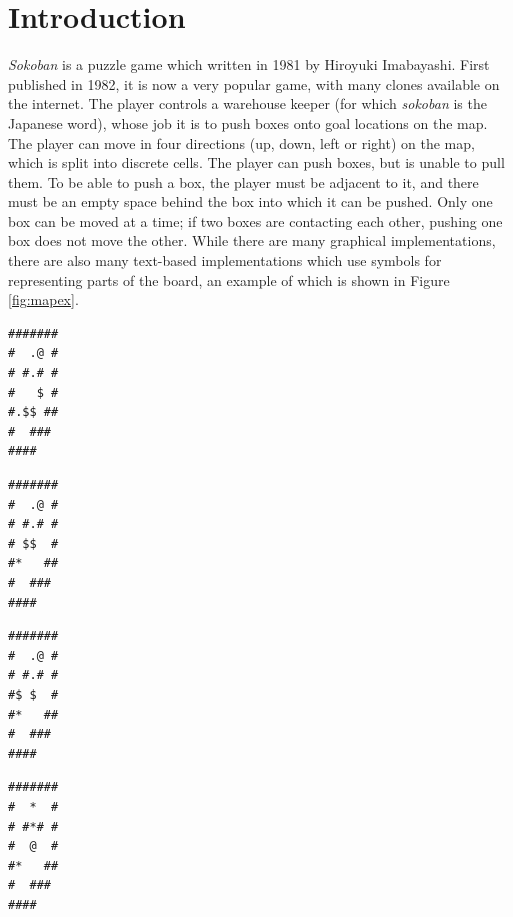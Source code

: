 \documentclass[a4paper,11pt]{article}
\begin{document}
\section{Introduction}
\emph{Sokoban} is a puzzle game which written in 1981 by Hiroyuki Imabayashi. First published in 1982, it is now a very popular game, with many clones available on the internet. The player controls a warehouse keeper (for which \emph{sokoban} is the Japanese word), whose job it is to push boxes onto goal locations on the map. The player can move in four directions (up, down, left or right) on the map, which is split into discrete cells. The player can push boxes, but is unable to pull them. To be able to push a box, the player must be adjacent to it, and there must be an empty space behind the box into which it can be pushed. Only one box can be moved at a time; if two boxes are contacting each other, pushing one box does not move the other. While there are many graphical implementations, there are also many text-based implementations which use symbols for representing parts of the board, an example of which is shown in Figure \ref{fig:mapex}.

\begin{lrbox}{\boxone}
  \begin{minipage}{.25\textwidth}
\centering
\begin{BVerbatim}
#######
#  .@ #
# #.# #
#   $ #
#.$$ ##
#  ###
####
\end{BVerbatim}
  \end{minipage}
\end{lrbox}%

\begin{lrbox}{\boxtwo}
  \begin{minipage}{.25\textwidth}
\centering
\begin{BVerbatim}
#######
#  .@ #
# #.# #
# $$  #
#*   ##
#  ###
####
\end{BVerbatim}
  \end{minipage}
\end{lrbox}%

\begin{lrbox}{\boxthree}
  \begin{minipage}{.25\textwidth}
\centering
\begin{BVerbatim}
#######
#  .@ #
# #.# #
#$ $  #
#*   ##
#  ###
####
\end{BVerbatim}
  \end{minipage}
\end{lrbox}%

\begin{lrbox}{\boxfour}
  \begin{minipage}{.25\textwidth}
\centering
\begin{BVerbatim}
#######
#  *  #
# #*# #
#  @  #
#*   ##
#  ###
####
\end{BVerbatim}
  \end{minipage}
\end{lrbox}%
\end{document}
